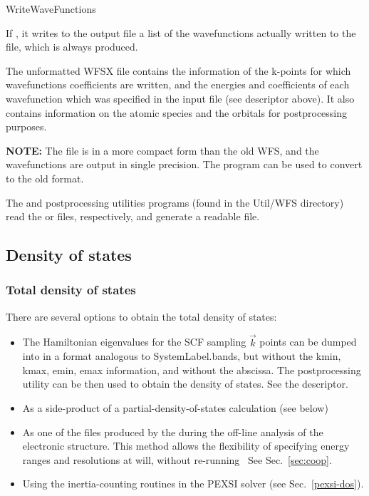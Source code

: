 \begin{fdflogicalF}{WriteWaveFunctions}

  If \fdftrue, it writes to the output file a list of the
  wavefunctions actually written to the  file,
  which is always produced.

\end{fdflogicalF}

The unformatted WFSX file contains the information of the
k-points for which wavefunctions coefficients are written, and the
energies and coefficients of each wavefunction which was specified in
the input file (see  descriptor above). It also contains information
on the atomic species and the orbitals for postprocessing purposes.

\textbf{NOTE:} The  file is in a more compact
form than the old WFS, and the wavefunctions are output in single
precision. The  program can be used to
convert to the old format.

\noindent
The  and
 postprocessing utilities programs
(found in the Util/WFS directory) read the  or
 files, respectively, and generate a readable file.



\subsection{Density of states}
\label{sec:dos}

\subsubsection{Total density of states}
There are several options to obtain the
total density of states:
\begin{itemize}
  
  \item The Hamiltonian eigenvalues for the SCF sampling $\vec k$ points can be
  dumped into  in a format analogous to SystemLabel.bands,
  but without the kmin, kmax, emin, emax information, and without
  the abscissa. The 
  postprocessing utility can be then used to obtain the density of
  states.
  See the  descriptor.

  \item As a side-product of a partial-density-of-states calculation
  (see below)

  \item As one of the files produced by the  during
  the off-line analysis of the electronic structure. This method
  allows the flexibility of specifying energy ranges and resolutions
  at will, without re-running \siesta\ See Sec.~\ref{sec:coop}.

  \item Using the inertia-counting routines in the PEXSI solver (see
  Sec.~\ref{pexsi-dos}).
  
\end{itemize}

